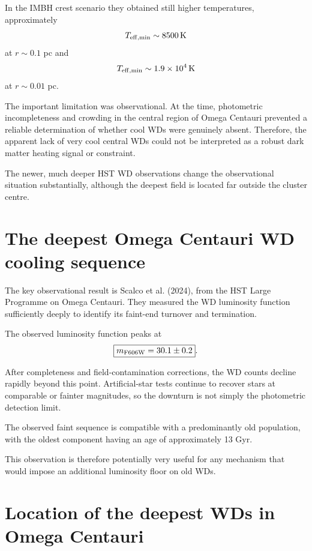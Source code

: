 \documentclass[11pt,a4paper]{article}
\begin{document}
In the IMBH crest scenario they obtained still higher temperatures, approximately
\begin{equation}
T_{\rm eff,min}\sim8500\,{\rm K}
\end{equation}
at $r\sim0.1$ pc and
\begin{equation}
T_{\rm eff,min}\sim1.9\times10^4\,{\rm K}
\end{equation}
at $r\sim0.01$ pc.

The important limitation was observational. At the time, photometric incompleteness and crowding in the central region of Omega Centauri prevented a reliable determination of whether cool WDs were genuinely absent. Therefore, the apparent lack of very cool central WDs could not be interpreted as a robust dark matter heating signal or constraint.

The newer, much deeper HST WD observations change the observational situation substantially, although the deepest field is located far outside the cluster centre.


\section{The deepest Omega Centauri WD cooling sequence}

The key observational result is Scalco et al. (2024), from the HST Large Programme on Omega Centauri. They measured the WD luminosity function sufficiently deeply to identify its faint-end turnover and termination.

The observed luminosity function peaks at
\begin{equation}
\boxed{
m_{\rm F606W}=30.1\pm0.2
}.
\end{equation}

After completeness and field-contamination corrections, the WD counts decline rapidly beyond this point. Artificial-star tests continue to recover stars at comparable or fainter magnitudes, so the downturn is not simply the photometric detection limit.

The observed faint sequence is compatible with a predominantly old population, with the oldest component having an age of approximately 13 Gyr.

This observation is therefore potentially very useful for any mechanism that would impose an additional luminosity floor on old WDs.


\section{Location of the deepest WDs in Omega Centauri}
\end{document}
